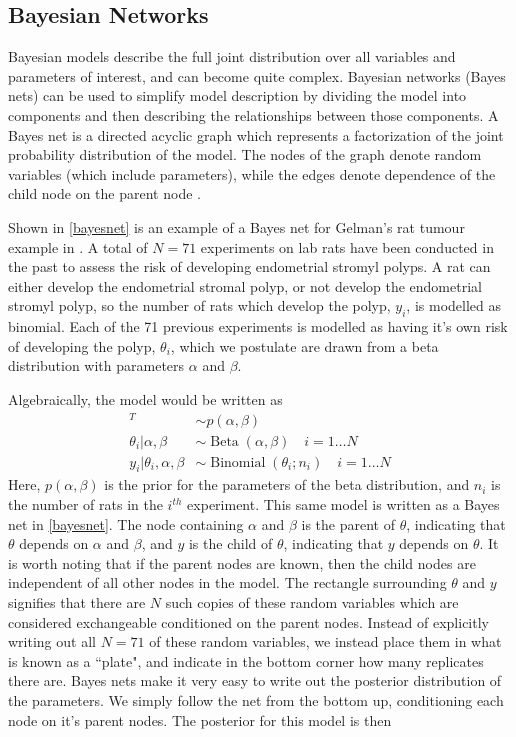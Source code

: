 \subsection{Bayesian Networks}



Bayesian models describe the full joint distribution over all variables and parameters of interest, and can become quite complex. Bayesian networks (Bayes nets) can be used to simplify model description by dividing the model into components and then describing the relationships between those components. A Bayes net is a directed acyclic graph which represents a factorization of the joint probability distribution of the model. The nodes of the graph denote random variables (which include parameters), while the edges denote dependence of the child node on the parent node \cite{Bishop2006pattern}. 

Shown in \cref{bayesnet} is an example of a Bayes net for Gelman's rat tumour example in \cite{gelman2013bayesian}.  A total of $ N = 71 $ experiments on lab rats have been conducted in the past to assess the risk of developing endometrial stromyl polyps.  A rat can either develop the endometrial stromal polyp, or not develop the endometrial stromyl polyp, so the number of rats which develop the polyp, $ y_i $, is modelled as binomial.  Each of the 71 previous experiments is modelled as having it's own risk of developing the polyp, $ \theta_i $, which we postulate are drawn from a beta distribution with parameters $ \alpha $ and $ \beta $.  

Algebraically, the model would be written as 
%
\begin{align*}
	[\alpha,\beta]^T &\sim p(\alpha, \beta) \\
	\theta_i \vert \alpha, \beta &\sim \operatorname{Beta}(\alpha,\beta) \quad i = 1 \dots N\\
	y_i \vert \theta_i, \alpha, \beta &\sim \operatorname{Binomial}(\theta_i ; n_i) \quad i = 1 \dots N
	\end{align*}
%
Here, $ p(\alpha, \beta)  $ is the prior for the parameters of the beta distribution, and $ n_i $ is the number of rats in the $ i^{th} $ experiment.  This same model is written as a Bayes net in \cref{bayesnet}.   The node containing $ \alpha $ and $ \beta $ is the parent of $ \theta $, indicating that $ \theta $ depends on $ \alpha $ and $ \beta $, and $ y $ is the child of $ \theta $, indicating that $ y $ depends on $ \theta $. It is worth noting that if the parent nodes are known, then the child nodes are independent of all other nodes in the model. The rectangle surrounding $ \theta $ and $ y $ signifies that there are $ N $ such copies of these random variables which are considered exchangeable conditioned on the parent nodes.  Instead of explicitly writing out all $ N=71 $ of these random variables, we instead place them in what is known as a ``plate", and indicate in the bottom corner how many replicates there are.  Bayes nets make it very easy to write out the posterior distribution of the parameters.  We simply follow the net from the bottom up, conditioning each node on it's parent nodes.  The posterior for this model is then

